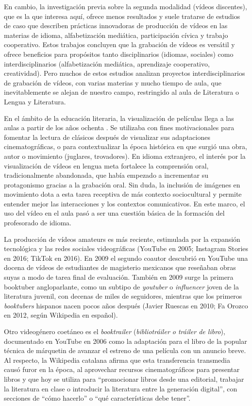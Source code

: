 \documentclass[spanish]{textolivre}
\begin{document}
En cambio, la investigación previa sobre la segunda modalidad (vídeos discentes), que es la que interesa aquí, ofrece menos resultados y suele tratarse de estudios de caso que describen prácticas innovadoras de producción de vídeos en las materias de idioma, alfabetización mediática, participación cívica y trabajo cooperativo. Estos trabajos concluyen que la grabación de vídeos es versátil y ofrece beneficios para propósitos tanto disciplinarios (idiomas, sociales) como interdisciplinarios (alfabetización mediática, aprendizaje cooperativo, creatividad). Pero muchos de estos estudios \cite{hobbs_past_2009} analizan proyectos interdisciplinarios de grabación de vídeos, con varias materias y mucho tiempo de aula, que inevitablemente se alejan de nuestro campo, restringido al aula de Literatura o Lengua y Literatura.

En el ámbito de la educación literaria, la visualización de películas llega a las aulas a partir de los años ochenta \cite{ferres_video_1992}. Se utilizaba con fines motivacionales para fomentar la lectura de clásicos después de visualizar sus adaptaciones cinematográficas, o para contextualizar la época histórica en que surgió una obra, autor o movimiento (juglares, trovadores). En idioma extranjero, el interés por la visualización de vídeos en lengua meta fortalece la comprensión oral, tradicionalmente abandonada, que había empezado a incrementar su protagonismo gracias a la grabación oral. Sin duda, la inclusión de imágenes en movimiento dota a esta tarea receptiva de más contexto sociocultural y permite entender mejor las interacciones y los contextos comunicativos. En este marco, el uso del vídeo en el aula pasó a ser una cuestión básica de la formación del profesorado de idioma.

La producción de vídeos amateurs es más reciente, estimulada por la expansión tecnológica y las redes sociales videográficas (YouTube en 2005; Instagram Stories en 2016; TikTok en 2016). En 2009 el segundo coautor descubrió en YouTube una docena de vídeos de estudiantes de magisterio mexicanos que reseñaban obras suyas a modo de tarea final de evaluación. También en 2009 surge la primera booktuber angloparlante, como un subtipo de \textit{youtuber} o \textit{influencer} joven de la literatura juvenil, con decenas de miles de seguidores, mientras que los primeros \textit{booktubers} hispanos nacen pocos años después (Javier Ruescas en 2010; Fa Orozco en 2012, según Wikipedia en español).

Otro videogénero coetáneo es el \textit{booktrailer} (\textit{bibliotráiler o tráiler de libro}), documentado en YouTube en 2006 como la adaptación para el libro de la popular técnica de márquetin de avanzar el estreno de una película con un anuncio breve. Al respecto, la Wikipedia catalana afirma que esta transferencia transmedia causó furor en la época, al aprovechar recursos cinematográficos para presentar libros y que hoy se utiliza para “promocionar libros desde una editorial, trabajar la literatura en clase o introducir la literatura entre la generación digital”, con secciones de “cómo hacerlo” o “qué características debe tener”.
\end{document}
